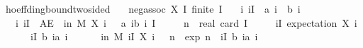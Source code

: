 \documentclass[a4paper,UKenglish,cleveref, autoref, thm-restate]{lipics-v2021}
\newenvironment{isabelle_cm}{\begin{mdframed}[backgroundcolor=shadecolor,nobreak=true,linewidth=0]\begin{isabelle}}{\end{isabelle}\end{mdframed}}%
\begin{document}
\begin{isabelle_cm}
\isamarkupfalse%
\ hoeffding{\isacharunderscore}{\kern0pt}bound{\isacharunderscore}{\kern0pt}two{\isacharunderscore}{\kern0pt}sided{\isacharcolon}{\kern0pt}\isanewline
\ \ \ {\isacartoucheopen}neg{\isacharunderscore}{\kern0pt}assoc\ X\ I{\isacartoucheclose}\ {\isacartoucheopen}finite\ I{\isacartoucheclose}\isanewline
\ \ \ {\isacartoucheopen}{\isasymAnd}i{\isachardot}{\kern0pt}\ i{\isasymin}I\ {\isasymLongrightarrow}\ a\ i\ {\isasymle}\ b\ i{\isacartoucheclose}\isanewline
\ \ \ {\isacartoucheopen}{\isasymAnd}i{\isachardot}{\kern0pt}\ i{\isasymin}I\ {\isasymLongrightarrow}\ AE\ {\isasymomega}\ in\ M{\isachardot}{\kern0pt}\ X\ i\ {\isasymomega}\ {\isasymin}\ {\isacharbraceleft}{\kern0pt}a\ i{\isachardot}{\kern0pt}{\isachardot}{\kern0pt}b\ i{\isacharbraceright}{\kern0pt}{\isacartoucheclose}\ {\isacartoucheopen}I\ {\isasymnoteq}\ {\isacharbraceleft}{\kern0pt}{\isacharbraceright}{\kern0pt}{\isacartoucheclose}\isanewline
\ \ \ {\isacartoucheopen}n\ {\isasymequiv}\ real\ {\isacharparenleft}{\kern0pt}card\ I{\isacharparenright}{\kern0pt}{\isacartoucheclose}\isanewline
\ \ \ {\isacartoucheopen}{\isasymmu}\ {\isasymequiv}\ {\isacharparenleft}{\kern0pt}{\isasymSum}i{\isasymin}I{\isachardot}{\kern0pt}\ expectation\ {\isacharparenleft}{\kern0pt}X\ i{\isacharparenright}{\kern0pt}{\isacharparenright}{\kern0pt}{\isacartoucheclose}\isanewline
\ \ \ {\isacartoucheopen}{\isasymdelta}\ {\isasymge}\ {}{\isacartoucheclose}\ {\isacartoucheopen}{\isacharparenleft}{\kern0pt}{\isasymSum}i{\isasymin}I{\isachardot}{\kern0pt}\ {\isacharparenleft}{\kern0pt}b\ i{\isacharminus}{\kern0pt}a\ i{\isacharparenright}\ {\isachargreater}{\kern0pt}\ {}{\isacartoucheclose}\isanewline
\ \ \ {\isacartoucheopen}{\isasymP}{\isacharparenleft}{\kern0pt}{\isasymomega}\ in\ M{\isachardot}{\kern0pt}\ {\isasymbar}{\isacharparenleft}{\kern0pt}{\isasymSum}i{\isasymin}I{\isachardot}{\kern0pt}\ X\ i\ {\isasymomega}{\isacharparenright}{\kern0pt}{\isacharminus}{\kern0pt}{\isasymmu}{\isasymbar}\ {\isasymge}\ {\isasymdelta}{\isacharasterisk}{\kern0pt}n{\isacharparenright}{\kern0pt}\ {\isasymle}\ {}{\isacharasterisk}{\kern0pt}exp\ {\isacharparenleft}{\kern0pt}{\isacharminus}{\kern0pt}{}{\isacharasterisk}{\kern0pt}{\isacharparenleft}{\kern0pt}n{\isacharasterisk}{\kern0pt}{\isasymdelta}{\isacharparenright}{\kern0pt}\ {\isacharslash}{\kern0pt}\ {\isacharparenleft}{\kern0pt}{\isasymSum}i{\isasymin}I{\isachardot}{\kern0pt}\ {\isacharparenleft}{\kern0pt}b\ i{\isacharminus}{\kern0pt}a\ i{\isacharparenright}
\end{isabelle_cm}
\end{document}
